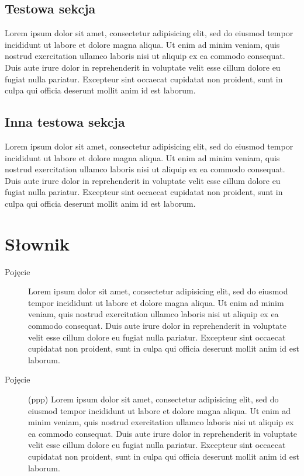 \documentclass[a4paper,titlepage,twoside,openright]{report} %
\begin{document}
		\section{Testowa sekcja}
		
		Lorem ipsum dolor sit amet, consectetur adipisicing elit, sed do eiusmod tempor incididunt 
		ut labore et dolore magna aliqua. Ut enim ad 	minim veniam, quis nostrud exercitation 
		ullamco laboris nisi ut aliquip ex ea commodo consequat. Duis aute irure dolor in reprehenderit 
		in voluptate velit esse cillum dolore eu fugiat nulla pariatur. Excepteur sint occaecat 
		cupidatat non proident, sunt in culpa qui officia deserunt mollit anim id est laborum.
		
		\section{Inna testowa sekcja}
		
		Lorem ipsum dolor sit amet, consectetur adipisicing elit, sed do eiusmod tempor incididunt 
		ut labore et dolore magna aliqua. Ut enim ad 	minim veniam, quis nostrud exercitation 
		ullamco laboris nisi ut aliquip ex ea commodo consequat. Duis aute irure dolor in reprehenderit 
		in voluptate velit esse cillum dolore eu fugiat nulla pariatur. Excepteur sint occaecat 
		cupidatat non proident, sunt in culpa qui officia deserunt mollit anim id est laborum.
		
\cleardoublepage

\chapter*{Słownik}
		
		\begin{description}
			\item[Pojęcie]
				Lorem ipsum dolor sit amet, consectetur adipisicing elit, sed do eiusmod tempor incididunt 
				ut labore et dolore magna aliqua. Ut enim ad 	minim veniam, quis nostrud exercitation 
				ullamco laboris nisi ut aliquip ex ea commodo consequat. Duis aute irure dolor in reprehenderit 
				in voluptate velit esse cillum dolore eu fugiat nulla pariatur. Excepteur sint occaecat 
				cupidatat non proident, sunt in culpa qui officia deserunt mollit anim id est laborum.				
			\item[Pojęcie] (ppp) 
				Lorem ipsum dolor sit amet, consectetur adipisicing elit, sed do eiusmod tempor incididunt 
				ut labore et dolore magna aliqua. Ut enim ad 	minim veniam, quis nostrud exercitation 
				ullamco laboris nisi ut aliquip ex ea commodo consequat. Duis aute irure dolor in reprehenderit 
				in voluptate velit esse cillum dolore eu fugiat nulla pariatur. Excepteur sint occaecat 
				cupidatat non proident, sunt in culpa qui officia deserunt mollit anim id est laborum.
		\end{description}
	
\end{document}
